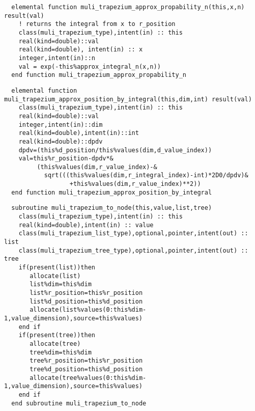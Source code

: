 \begin{Verbatim}
  elemental function muli_trapezium_approx_propability_n(this,x,n) result(val)
    ! returns the integral from x to r_position
    class(muli_trapezium_type),intent(in) :: this
    real(kind=double)::val
    real(kind=double), intent(in) :: x
    integer,intent(in)::n
    val = exp(-this%approx_integral_n(x,n))
  end function muli_trapezium_approx_propability_n
\end{Verbatim}
\begin{Verbatim}
  elemental function muli_trapezium_approx_position_by_integral(this,dim,int) result(val)
    class(muli_trapezium_type),intent(in) :: this
    real(kind=double)::val
    integer,intent(in)::dim
    real(kind=double),intent(in)::int
    real(kind=double)::dpdv    
    dpdv=(this%d_position/this%values(dim,d_value_index))
    val=this%r_position-dpdv*&
         (this%values(dim,r_value_index)-&
           sqrt(((this%values(dim,r_integral_index)-int)*2D0/dpdv)&
                  +this%values(dim,r_value_index)**2))
  end function muli_trapezium_approx_position_by_integral
\end{Verbatim}

\begin{Verbatim}
  subroutine muli_trapezium_to_node(this,value,list,tree)
    class(muli_trapezium_type),intent(in) :: this
    real(kind=double),intent(in) :: value  
    class(muli_trapezium_list_type),optional,pointer,intent(out) :: list
    class(muli_trapezium_tree_type),optional,pointer,intent(out) :: tree
    if(present(list))then
       allocate(list)
       list%dim=this%dim
       list%r_position=this%r_position
       list%d_position=this%d_position
       allocate(list%values(0:this%dim-1,value_dimension),source=this%values)
    end if
    if(present(tree))then
       allocate(tree)
       tree%dim=this%dim
       tree%r_position=this%r_position
       tree%d_position=this%d_position
       allocate(tree%values(0:this%dim-1,value_dimension),source=this%values)
    end if    
  end subroutine muli_trapezium_to_node
\end{Verbatim}

